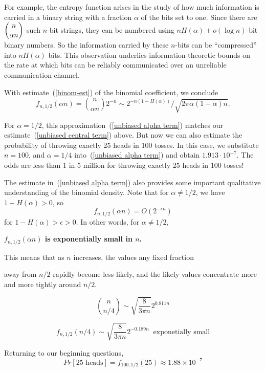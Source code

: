\documentclass[11pt,twoside]{article}
\begin{document}
For example, the entropy function arises in the study of how much
information is carried in a binary string with a fraction $\alpha$ of the
bits set to one.  Since there are $\dbinom{n}{\alpha n}$ such $n$-bit
strings, they can be numbered using $nH(\alpha) + o(\log n)$-bit binary
numbers.  So the information carried by these $n$-bits can be
``compressed'' into $nH(\alpha)$ bits.  This observation underlies
information-theoretic bounds on the rate at which bits can be reliably
communicated over an unreliable communication channel.

With estimate~(\ref{binom-est}) of the binomial coefficient, we conclude
\begin{equation}\label{unbiased alpha term}
f_{n,1/2}(\alpha n) = \binom{n}{\alpha n}2^{-n} \sim
2^{-n(1 - H(\alpha))}/\sqrt{2\pi \alpha(1-\alpha)n}.
\end{equation}

For $\alpha = 1/2$, this approximation~(\ref{unbiased alpha term}) matches
our estimate~(\ref{unbiased central term}) above.  But now we can also
estimate the probability of throwing exactly 25 heads in 100 tosses.  In
this case, we substitute $n = 100$, and $\alpha = 1/4$ into~(\ref{unbiased
alpha term}) and obtain $1.913 \cdot 10^{-7}$.  The odds are less than 1
in 5 million for throwing exactly 25 heads in 100 tosses!

The estimate in~(\ref{unbiased alpha term}) also provides some important
qualitative understanding of the binomial density.  Note that for
$\alpha \neq 1/2$, we have $1- H(\alpha) > 0$, so
\[
f_{n,1/2}(\alpha n) = O(2^{-\epsilon n})
\]
for $ 1 - H(\alpha) > \epsilon > 0$.  In other words, for $\alpha \neq 1/2$,
\begin{center}
\textbf{$f_{n,1/2}(\alpha n)$ is exponentially small in $n$.}
\end{center}
This means that as $n$ increases, the values any fixed fraction

away from $n/2$ rapidly become less likely, and the likely values
concentrate more and more tightly around $n/2$.

\iffalse

\begin{example}

$$ \binom{n}{n/4} \sim \sqrt{\frac{8}{3\pi n}}2^{0.811n} $$

$$ f_{n,1/2}(n/4) \sim \sqrt{\frac{8}{3\pi n}}2^{-0.189n} \;\;
\text{exponetially small} $$

Returning to our beginning questions, 
$$ Pr[\mbox{25 heads}] = f_{100,1/2}(25) \approx 1.88 \times 10^{-7} $$

\end{example}
\end{document}
